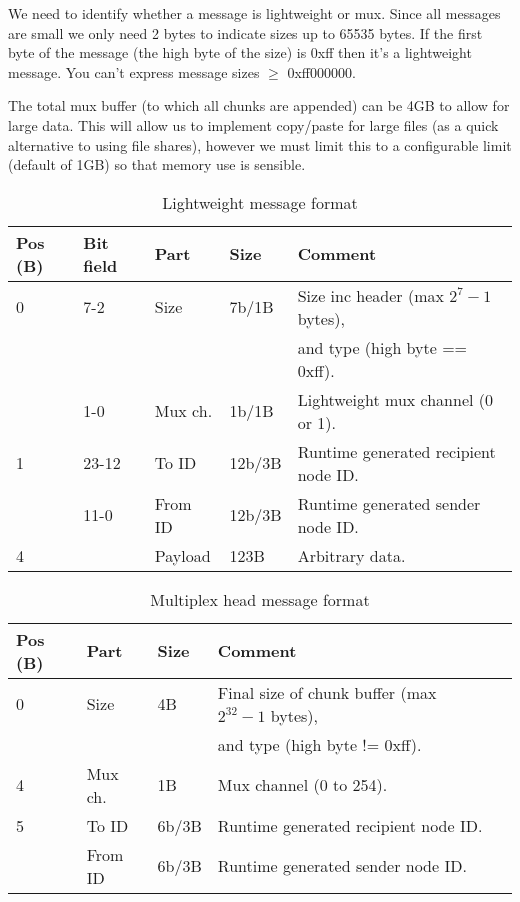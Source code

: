 We need to identify whether a message is lightweight or mux. Since all
messages are small we only need 2 bytes to indicate sizes up to 65535 bytes.
If the first byte of the message (the high byte of the size) is 0xff then 
it's a lightweight message. You can't express message sizes $\geq$ 0xff000000.

The total mux buffer (to which all chunks are appended) can be 4GB to allow 
for large data. This will allow us to implement copy/paste for large files
(as a quick alternative to using file shares), however we must limit this
to a configurable limit (default of 1GB) so that memory use is sensible.

\begin{table}[ht!]
  \begin{tabular}{|l|l|l|l|l|}
    \hline
    \textbf{Pos (B)} &
    \textbf{Bit field} &
    \textbf{Part} &
    \textbf{Size} &
    \textbf{Comment} \\
    \hline
    0 & 7-2 & Size & 7b/1B & Size inc header (max $2^7-1$ bytes), \\
      &     &      &       & and type (high byte == 0xff). \\
      & 1-0 & Mux ch. & 1b/1B & Lightweight mux channel (0 or 1). \\
    1 & 23-12 & To ID & 12b/3B & Runtime generated recipient node ID. \\
      & 11-0 & From ID & 12b/3B & Runtime generated sender node ID. \\
    4 & & Payload & 123B & Arbitrary data. \\
    \hline
  \end{tabular}
  \caption{Lightweight message format}
  \label{tab:lightMessage}
\end{table}

\begin{table}[ht!]
  \begin{tabular}{|l|l|l|l|l|}
    \hline
    \textbf{Pos (B)} &
    \textbf{Part} &
    \textbf{Size} &
    \textbf{Comment} \\
    \hline
    0 & Size & 4B & Final size of chunk buffer (max $2^{32}-1$ bytes), \\ 
      &      &    & and type (high byte != 0xff). \\
    4 & Mux ch. & 1B & Mux channel (0 to 254). \\
    5 & To ID & 6b/3B & Runtime generated recipient node ID. \\
      & From ID & 6b/3B & Runtime generated sender node ID. \\
    \hline
  \end{tabular}
  \caption{Multiplex head message format}
  \label{tab:muxHeadMessage}
\end{table}

